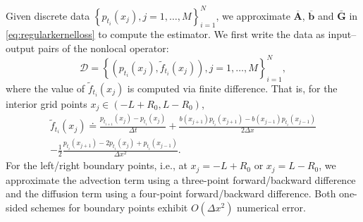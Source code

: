 \documentclass[12pt]{article}
\def\Abar{ {\overline{A}} }
\def\bbar{ {\overline{b}} }
\numberwithin{equation}{section}
\numberwithin{theorem}{section}
\begin{document}
Given discrete data $\left\{p_{t_i}\left(x_j\right), j=1, \ldots, M\right\}_{i=1}^N$, we approximate $\mathbf{\Abar}$, $\mathbf{\bbar}$ and $\bar{\mathbf{G}}$ in \eqref{eq:regularkernelloss} to compute the estimator. We first write the data as input–output pairs of the nonlocal operator: 
\begin{equation}
\label{eq: discretedata}
\mathcal{D}=\left\{\left(p_{t_i}\left(x_j\right), \tilde{f}_{t_i}\left(x_j\right)\right), j=1, \ldots, M\right\}_{i=1}^N,
\end{equation}
where the value of $\tilde{f}_{t_i}(x_j)$ is computed via finite difference. That is, for the interior grid points $x_j \in (-L+R_0, L-R_0)$, 
\begin{equation}
\label{eq: discretef}
\begin{gathered}
\tilde{f}_{t_i}\left(x_j\right) \doteq \frac{p_{t_{i+1}}\left(x_j\right)-p_{t_{i}}\left(x_j\right)}{\Delta t}+\frac{b\left(x_{j+1}\right) p_{t_{i}}\left(x_{j+1}\right)-b\left(x_{j-1}\right) p_{t_{i}}\left(x_{j-1}\right)}{2 \Delta x} \\
-\frac{1}{2} \frac{p_{t_{i}}\left(x_{j+1}\right)-2 p_{t_{i}}\left(x_{j}\right)+p_{t_{i}}\left(x_{j-1}\right)}{\Delta x^2}.
\end{gathered}
\end{equation}
For the left/right boundary points, i.e., at $x_j=-L+R_0$ or $x_j=L-R_0$, we approximate the advection term using a three-point forward/backward difference and the diffusion term using a four-point forward/backward difference. Both one-sided schemes for boundary points exhibit $O\left(\Delta x^2\right)$ numerical error. 
\end{document}
